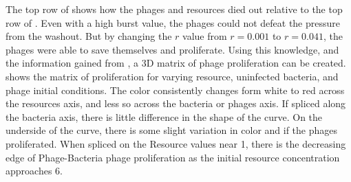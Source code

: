 The top row of  shows how the phages and resources died out relative to the top row of . 
Even with a high burst value, the phages could not defeat the pressure from the washout. 
But by changing the $r$ value from $r=0.001$ to $r=0.041$, the phages were able to save themselves and proliferate. 
Using this knowledge, and the information gained from , a 3D matrix of phage proliferation can be created. 
 shows the matrix of proliferation for varying resource, uninfected bacteria, and phage initial conditions. 
The color consistently changes form white to red across the resources axis, and less so across the bacteria or phages axis. 
If spliced along the bacteria axis, there is little difference in the shape of the curve. 
On the underside of the curve, there is some slight variation in color and if the phages proliferated. 
When spliced on the Resource values near 1, there is the decreasing edge of Phage-Bacteria phage proliferation as the initial resource concentration approaches 6. 


